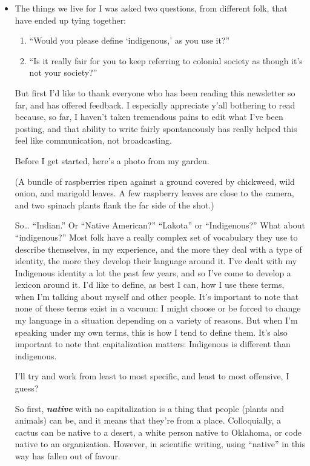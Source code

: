 \documentclass[11pt]{article}
\begin{document}
\begin{itemize}
\item The things we live for
\label{sec:orgc6a2361}
I was asked two questions, from different folk, that have ended up tying together:

\begin{enumerate}
\item “Would you please define ‘indigenous,’ as you use it?”

\item “Is it really fair for you to keep referring to colonial society as though it’s not your society?”
\end{enumerate}

But first I’d like to thank everyone who has been reading this newsletter so far, and has offered feedback. I especially appreciate y’all bothering to read because, so far, I haven’t taken tremendous pains to edit what I’ve been posting, and that ability to write fairly spontaneously has really helped this feel like communication, not broadcasting.

Before I get started, here’s a photo from my garden.

(A bundle of raspberries ripen against a ground covered by chickweed, wild onion, and marigold leaves. A few raspberry leaves are close to the camera, and two spinach plants flank the far side of the shot.)

So… “Indian.” Or “Native American?” “Lakota” or “Indigenous?” What about “indigenous?” Most folk have a really complex set of vocabulary they use to describe themselves, in my experience, and the more they deal with a type of identity, the more they develop their language around it. I’ve dealt with my Indigenous identity a lot the past few years, and so I’ve come to develop a lexicon around it. I’d like to define, as best I can, how I use these terms, when I’m talking about myself and other people. It’s important to note that none of these terms exist in a vacuum: I might choose or be forced to change my language in a situation depending on a variety of reasons. But when I’m speaking under my own terms, this is how I tend to define them. It’s also important to note that capitalization matters: Indigenous is different than indigenous.

I’ll try and work from least to most specific, and least to most offensive, I guess?

So first, \textbf{\emph{native}} with no capitalization is a thing that people (plants and animals) can be, and it means that they’re from a place. Colloquially, a cactus can be native to a desert, a white person native to Oklahoma, or code native to an organization. However, in scientific writing, using “native” in this way has fallen out of favour.


\end{itemize}
\end{document}

